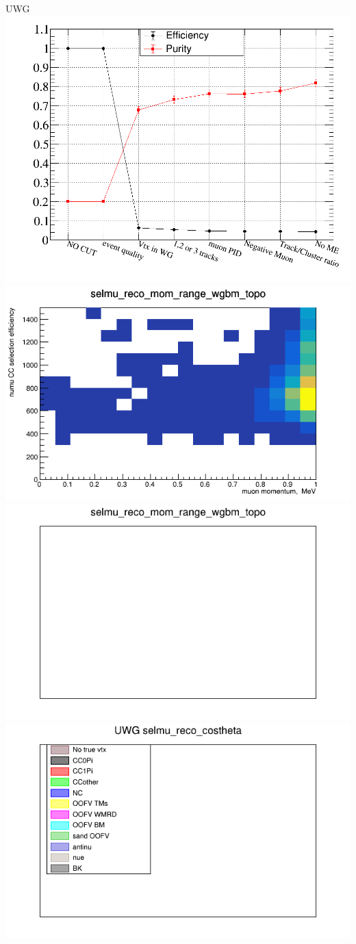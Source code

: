 \documentclass[%
 reprint,
 amsmath,amssymb,
 aps,
]{revtex4-2}
\begin{document}
\begin{frame}{UWG}
\center
\includegraphics[width=.45\textwidth]{images/EffPurVsCut_br1_true_wgbm_topo.png}
\includegraphics[width=.45\textwidth]{images/2D_selmu_mom:selmu_costheta_wgbm_topo_accum_level[][16]_data_mc.png}
\includegraphics[width=.45\textwidth]{images/ratio_selmu_reco_mom_range_wgbm_topo_accum_level[][16]_data_mc.png}
\includegraphics[width=.45\textwidth]{images/ratio_selmu_reco_costheta_wgbm_topo_UWG_accum_level[][16]_data_mc.png}
 

\end{frame}
\end{document}
